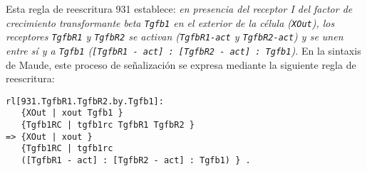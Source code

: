 Esta regla de reescritura 931 establece: {\em en presencia del receptor I del factor de crecimiento transformante beta \texttt{Tgfb1} en el exterior de la célula (\texttt{XOut}), los receptores \texttt{TgfbR1} y \texttt{TgfbR2} se activan (\texttt{TgfbR1-act} y \texttt{TgfbR2-act}) y se unen entre sí y a \texttt{Tgfb1} (\texttt{[TgfbR1 - act] : [TgfbR2 - act] : Tgfb1}).}
%
En la sintaxis de Maude, este proceso de señalización se expresa mediante la siguiente regla de reescritura: 

\begin{lstlisting}[language=Maude,caption={Regla de reescritura \texttt{931.TgfbR1.TgfbR2.by.Tgfb1}}]
rl[931.TgfbR1.TgfbR2.by.Tgfb1]:
   {XOut | xout Tgfb1 }  
   {Tgfb1RC | tgfb1rc TgfbR1 TgfbR2 }
=> {XOut | xout }        
   {Tgfb1RC | tgfb1rc 
   ([TgfbR1 - act] : [TgfbR2 - act] : Tgfb1) } .  
\end{lstlisting}











